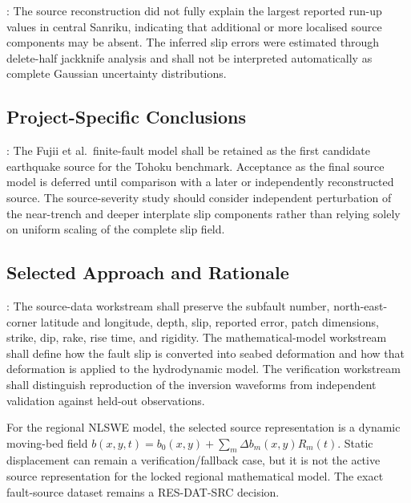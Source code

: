 
\textcite{fujii2011tsunamisource}: The source reconstruction did not fully explain the largest reported run-up values in central Sanriku, indicating that additional or more localised source components may be absent. The inferred slip errors were estimated through delete-half jackknife analysis and shall not be interpreted automatically as complete Gaussian uncertainty distributions.

\subsection{Project-Specific Conclusions}
\label{sec:res-phy-src-conclusions}


\textcite{fujii2011tsunamisource}: The Fujii et al.\ finite-fault model shall be retained as the first candidate earthquake source for the Tohoku benchmark. Acceptance as the final source model is deferred until comparison with a later or independently reconstructed source. The source-severity study should consider independent perturbation of the near-trench and deeper interplate slip components rather than relying solely on uniform scaling of the complete slip field.

\subsection{Selected Approach and Rationale}
\label{sec:res-phy-src-selected-approach}


\textcite{fujii2011tsunamisource}: The source-data workstream shall preserve the subfault number, north-east-corner latitude and longitude, depth, slip, reported error, patch dimensions, strike, dip, rake, rise time, and rigidity. The mathematical-model workstream shall define how the fault slip is converted into seabed deformation and how that deformation is applied to the hydrodynamic model. The verification workstream shall distinguish reproduction of the inversion waveforms from independent validation against held-out observations.

For the regional NLSWE model, the selected source representation is a
dynamic moving-bed field
$b(x,y,t)=b_0(x,y)+\sum_m\Delta b_m(x,y)R_m(t)$. Static displacement
can remain a verification/fallback case, but it is not the active
source representation for the locked regional mathematical model. The
exact fault-source dataset remains a RES-DAT-SRC decision.

